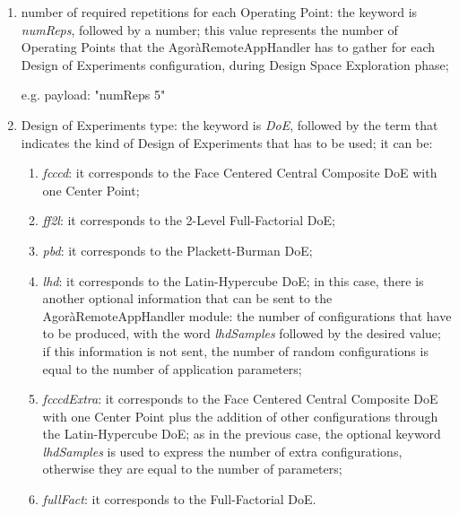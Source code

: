 \begin{enumerate}

    \item number of required repetitions for each Operating Point: the keyword is \textit{numReps}, followed by a number; this value represents the number of Operating Points that the AgoràRemoteAppHandler has to gather for each Design of Experiments configuration, during Design Space Exploration phase;
    
    e.g. payload: "numReps 5"
    
    \item Design of Experiments type: the keyword is \textit{DoE}, followed by the term that indicates the kind of Design of Experiments that has to be used; it can be:
    
    \begin{enumerate}
    
        \item \textit{fcccd}: it corresponds to the Face Centered Central Composite DoE with one Center Point;
        
        \item \textit{ff2l}: it corresponds to the 2-Level Full-Factorial DoE;
        
        \item \textit{pbd}: it corresponds to the Plackett-Burman DoE;
        
        \item \textit{lhd}: it corresponds to the Latin-Hypercube DoE; in this case, there is another optional information that can be sent to the AgoràRemoteAppHandler module: the number of configurations that have to be produced, with the word \textit{lhdSamples} followed by the desired value; if this information is not sent, the number of random configurations is equal to the number of application parameters;
        
        \item \textit{fcccdExtra}: it corresponds to the Face Centered Central Composite DoE with one Center Point plus the addition of other configurations through the Latin-Hypercube DoE; as in the previous case, the optional keyword \textit{lhdSamples} is used to express the number of extra configurations, otherwise they are equal to the number of parameters;
        
        \item \textit{fullFact}: it corresponds to the Full-Factorial DoE.
    
    \end{enumerate}
    

\end{enumerate}
